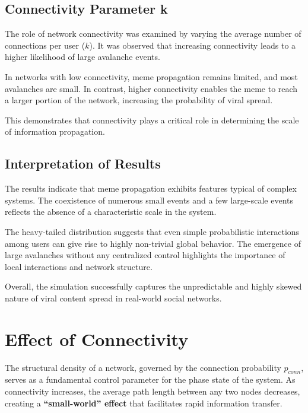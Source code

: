 \documentclass[12pt]{article}
\begin{document}
\subsection{Connectivity Parameter k}

The role of network connectivity was examined by varying the average number of connections per user ($k$). It was observed that increasing connectivity leads to a higher likelihood of large avalanche events.

In networks with low connectivity, meme propagation remains limited, and most avalanches are small. In contrast, higher connectivity enables the meme to reach a larger portion of the network, increasing the probability of viral spread.

This demonstrates that connectivity plays a critical role in determining the scale of information propagation.

\subsection{Interpretation of Results}

The results indicate that meme propagation exhibits features typical of complex systems. The coexistence of numerous small events and a few large-scale events reflects the absence of a characteristic scale in the system.

The heavy-tailed distribution suggests that even simple probabilistic interactions among users can give rise to highly non-trivial global behavior. The emergence of large avalanches without any centralized control highlights the importance of local interactions and network structure.

Overall, the simulation successfully captures the unpredictable and highly skewed nature of viral content spread in real-world social networks.

\newpage

\section{\Large Effect of Connectivity}


The structural density of a network, governed by the connection probability $p_{conn}$, serves as a fundamental control parameter for the phase state of the system. As connectivity increases, the average path length between any two nodes decreases, creating a \textbf{``small-world'' effect} that facilitates rapid information transfer. 
\end{document}
